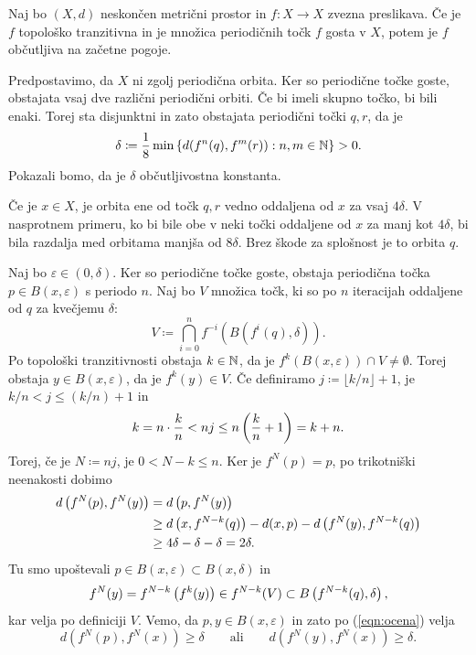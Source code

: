 \begin{izrek}
    Naj bo \((X, d)\) neskončen metrični prostor in \(f \colon X \to X\) zvezna preslikava. Če je \(f\) topološko tranzitivna in je množica periodičnih točk \(f\) gosta v \(X\), potem je \(f\) občutljiva na začetne pogoje.
\end{izrek}

\begin{dokaz}
    Predpostavimo, da \(X\) ni zgolj periodična orbita. Ker so periodične točke goste, obstajata vsaj dve različni periodični orbiti. Če bi imeli skupno točko, bi bili enaki. Torej sta disjunktni in zato obstajata periodični točki \(q, r\), da je
    \[\delta \coloneq \frac{1}{8} \min \left\{ d (f^n (q), f^m (r)) : n, m \in \mathbb N \right\} > 0.\] Pokazali bomo, da je \(\delta\) občutljivostna konstanta.

    Če je \(x \in X\), je orbita ene od točk \(q, r\) vedno oddaljena od \(x\) za vsaj \(4 \delta\). V nasprotnem primeru, ko bi bile obe v neki točki oddaljene od \(x\) za manj kot \(4 \delta\), bi bila razdalja med orbitama manjša od \(8 \delta\). Brez škode za splošnost je to orbita \(q\).

    Naj bo \(\varepsilon \in (0, \delta)\). Ker so periodične točke goste, obstaja periodična točka \(p \in B (x, \varepsilon)\) s periodo \(n\). Naj bo \(V\) množica točk, ki so po \(n\) iteracijah oddaljene od \(q\) za kvečjemu \(\delta\):
    \[V \coloneq \bigcap_{i = 0}^n f^{- i} (B (f^i (q), \delta)).\]
    Po topološki tranzitivnosti obstaja \(k \in \mathbb N\), da je \(f^k (B (x, \varepsilon)) \cap V \neq \emptyset\). Torej obstaja \(y \in B (x, \varepsilon)\), da je \(f^k (y) \in V\). Če definiramo \(j \coloneq \lfloor k / n \rfloor + 1\), je \(k / n < j \leq (k / n) + 1\) in
    \[k = n \cdot \frac{k}{n} < n j \leq n \left( \frac{k}{n} + 1 \right) = k + n.\]
    Torej, če je \(N \coloneq n j\), je \(0 < N - k \leq n\). Ker je \(f^N (p) = p\), po trikotniški neenakosti dobimo
    \begin{align}
        d \left( f^N (p), f^N (y) \right) & = d \left( p, f^N (y) \right) \nonumber                                                              \\
                                 & \geq d \left( x, f^{N - k} (q) \right) - d (x, p) - d \left( f^N (y), f^{N - k} (q) \right) \label{eqn:ocena} \\
                                 & \geq 4 \delta - \delta - \delta = 2 \delta. \nonumber
    \end{align}
    Tu smo upoštevali \(p \in B (x, \varepsilon) \subset B (x, \delta)\) in
    \[f^N (y) = f^{N - k} \left( f^k (y) \right) \in f^{N - k} (V) \subset B \left( f^{N - k} (q), \delta \right),\]
    kar velja po definiciji \(V\). Vemo, da \(p, y \in B (x, \varepsilon)\) in zato po (\ref{eqn:ocena}) velja
    \[d (f^N (p), f^N (x)) \geq \delta \qquad \text{ali} \qquad d (f^N (y), f^N (x)) \geq \delta.\]
\end{dokaz}


